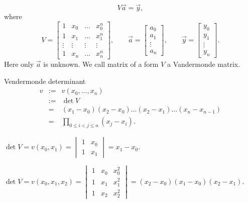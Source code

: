 \[
    V\vec{a} = \vec{y},
\]
where
\[
    V = \begin{bmatrix}
            1 & x_0 & \ldots & x_0^n \\
            1 & x_1 & \ldots & x_1^n \\
            \vdots & \vdots & \vdots & \vdots\\
            1 & x_n & \ldots & x_n^n
        \end{bmatrix}, \qquad 
    \vec{a} = 
        \begin{bmatrix}
            a_0 \\a_1 \\ \vdots \\ a_n
        \end{bmatrix},\qquad 
    \vec{y} = 
        \begin{bmatrix}
            y_0 \\y_1 \\ \vdots \\ y_n
        \end{bmatrix}.
\]
    Here only $\vec{a}$ is unknown. We call matrix of a form $V$ a Vandermonde matrix.

\begin{lemma}{Vendermonde determinant}{}
    \begin{eqnarray}
        v &:=& v(x_0, \ldots, x_n) \nonumber\\
        &:=& \det V \nonumber\\
        &=&  (x_1 - x_0)(x_2-x_0)\ldots(x_2-x_1)\ldots (x_n - x_{n-1}) \nonumber\\ 
        &=&\prod\limits_{0 \leq i < j \leq n} (x_j - x_i). \nonumber
    \end{eqnarray}
\end{lemma}
\Ex $\det V = v(x_0, x_1) = \begin{vmatrix}
    1 & x_0\\
    1 & x_1
\end{vmatrix} = x_1 - x_0$.

\Ex $\det V = v(x_0, x_1, x_2) = \begin{vmatrix}
    1 & x_0 & x_0^2\\
    1 & x_1 & x_1^2\\
    1 & x_2 & x_2^2
\end{vmatrix} = (x_2 - x_0)(x_1 - x_0)(x_2 - x_1)$.

